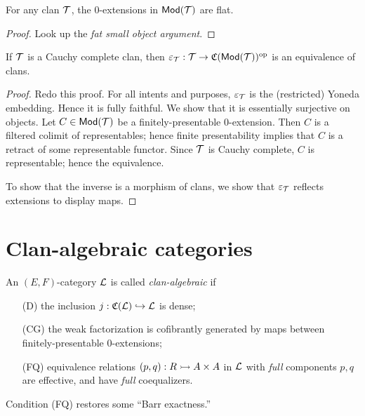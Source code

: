 \documentclass[a4paper]{article}
\begin{document}
\begin{corollary}
  For any clan $\mathcal{T}$, the 0-extensions in $\mathsf{Mod}(\mathcal{T})$ are flat.
\end{corollary}
\begin{proof}
  \todo Look up the \emph{fat small object argument}.
\end{proof}

\begin{theorem}
  If $\mathcal{T}$ is a Cauchy complete clan, then $\varepsilon_{\mathcal{T}} : \mathcal{T} \to \mathfrak{C}(\mathsf{Mod}(\mathcal{T}))^{\mathrm{op}}$ is an equivalence of clans.
\end{theorem}
\begin{proof}
  \todo Redo this proof.
  For all intents and purposes, $\varepsilon_{\mathcal{T}}$ is the (restricted) Yoneda embedding.
  Hence it is fully faithful.
  We show that it is essentially surjective on objects.
  Let $C \in \mathsf{Mod}(\mathcal{T})$ be a finitely-presentable 0-extension.
  Then $C$ is a filtered colimit of representables; hence finite presentability implies that $C$ is a retract of some representable functor.
  Since $\mathcal{T}$ is Cauchy complete, $C$ is representable; hence the equivalence.

  To show that the inverse is a morphism of clans, we show that $\varepsilon_{\mathcal{T}}$ reflects extensions to display maps.
\end{proof}

\section{Clan-algebraic categories}

\begin{definition}
  An $(E,F)$-category $\mathcal{L}$ is called \emph{clan-algebraic} if
  \begin{enumerate}
  \item[(D)] the inclusion $j : \mathfrak{C}(\mathcal{L}) \hookrightarrow \mathcal{L}$ is dense;
  \item[(CG)] the weak factorization is cofibrantly generated by maps between finitely-presentable $0$-extensions;
  \item[(FQ)] equivalence relations $(p,q) : R \rightarrowtail A \times A$ in $\mathcal{L}$ with \emph{full} components $p, q$ are effective, and have \emph{full} coequalizers.
  \end{enumerate}
\end{definition}

\begin{remark}
  Condition (FQ) restores some ``Barr exactness.''
\end{remark}
\end{document}
